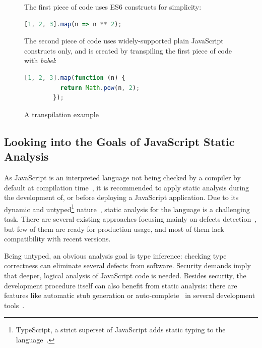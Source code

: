 \vspace{1em}
\begin{figure}[!htb]
	\centering
	\begin{minipage}{25em}
		The first piece of code uses ES6 constructs for simplicity:

		\begin{lstlisting}[language=JavaScript]
		[1, 2, 3].map(n => n ** 2);
		\end{lstlisting}

		The second piece of code uses widely-supported plain JavaScript constructs only, and is created by transpiling the first piece of code with \emph{babel}:

		\begin{lstlisting}[language=JavaScript]
		[1, 2, 3].map(function (n) {
		  return Math.pow(n, 2);
		});
		\end{lstlisting}
	\end{minipage}
  \caption{A transpilation example}
  \label{fig:transpiling-example}
\end{figure}


\subsection{Looking into the Goals of JavaScript Static Analysis}

As JavaScript is an interpreted language not being checked by a compiler by default at compilation time~\cite{373902}, it is recommended to apply static analysis during the development of, or before deploying a JavaScript application. Due to its dynamic and untyped\footnote{TypeScript, a strict superset of JavaScript adds static typing to the language~\cite{typescript-website}.} nature~\cite{flanagan2006javascript}, static analysis for the language is a challenging task. There are several existing approaches focusing mainly on defects detection~\cite{madsen2013practical, livshits2010gulfstream, jensen2009type}, but few of them are ready for production usage, and most of them lack compatibility with recent \es versions.

Being untyped, an obvious analysis goal is type inference: checking type correctness can eliminate several defects from software. Security demands imply that deeper, logical analysis of JavaScript code is needed. Besides security, the development procedure itself can also benefit from static analysis: there are features like automatic stub generation or auto-complete~\cite{madsen2013practical} in several development tools~\cite{esprima-autocomplete, webstorm-autocomplete}.


